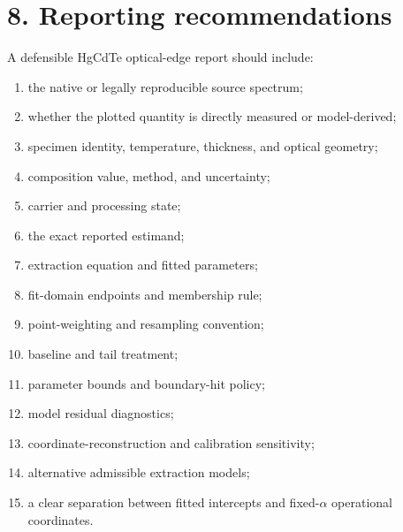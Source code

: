 \section{8. Reporting recommendations}\label{reporting-recommendations}

A defensible HgCdTe optical-edge report should include:

\begin{enumerate}
\def\labelenumi{\arabic{enumi}.}
\tightlist
\item
  the native or legally reproducible source spectrum;
\item
  whether the plotted quantity is directly measured or model-derived;
\item
  specimen identity, temperature, thickness, and optical geometry;
\item
  composition value, method, and uncertainty;
\item
  carrier and processing state;
\item
  the exact reported estimand;
\item
  extraction equation and fitted parameters;
\item
  fit-domain endpoints and membership rule;
\item
  point-weighting and resampling convention;
\item
  baseline and tail treatment;
\item
  parameter bounds and boundary-hit policy;
\item
  model residual diagnostics;
\item
  coordinate-reconstruction and calibration sensitivity;
\item
  alternative admissible extraction models;
\item
  a clear separation between fitted intercepts and fixed-\(\alpha\)
  operational coordinates.
\end{enumerate}
